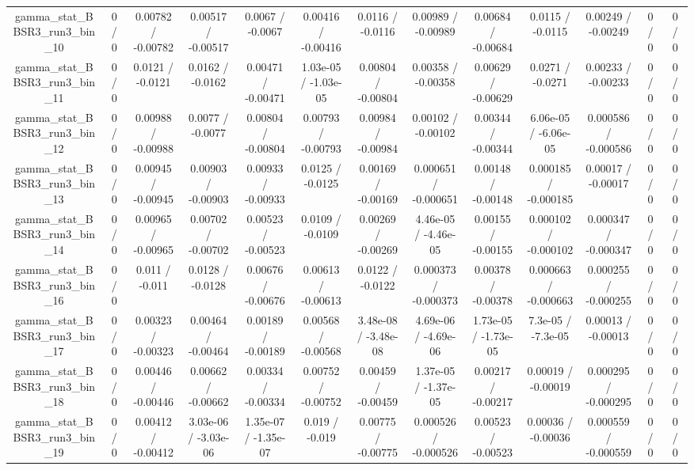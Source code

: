 \documentclass[10pt]{article}
\begin{document}
\begin{table}[htbp]
\begin{center}
\begin{tabular}{|c|c|c|c|c|c|c|c|c|c|c|c|c|}
  gamma_stat_BBSR3_run3_bin_10 & 0 / 0 & 0.00782 / -0.00782 & 0.00517 / -0.00517 & 0.0067 / -0.0067 & 0.00416 / -0.00416 & 0.0116 / -0.0116 & 0.00989 / -0.00989 & 0.00684 / -0.00684 & 0.0115 / -0.0115 & 0.00249 / -0.00249 & 0 / 0 & 0 / 0 \\ 
  gamma_stat_BBSR3_run3_bin_11 & 0 / 0 & 0.0121 / -0.0121 & 0.0162 / -0.0162 & 0.00471 / -0.00471 & 1.03e-05 / -1.03e-05 & 0.00804 / -0.00804 & 0.00358 / -0.00358 & 0.00629 / -0.00629 & 0.0271 / -0.0271 & 0.00233 / -0.00233 & 0 / 0 & 0 / 0 \\ 
  gamma_stat_BBSR3_run3_bin_12 & 0 / 0 & 0.00988 / -0.00988 & 0.0077 / -0.0077 & 0.00804 / -0.00804 & 0.00793 / -0.00793 & 0.00984 / -0.00984 & 0.00102 / -0.00102 & 0.00344 / -0.00344 & 6.06e-05 / -6.06e-05 & 0.000586 / -0.000586 & 0 / 0 & 0 / 0 \\ 
  gamma_stat_BBSR3_run3_bin_13 & 0 / 0 & 0.00945 / -0.00945 & 0.00903 / -0.00903 & 0.00933 / -0.00933 & 0.0125 / -0.0125 & 0.00169 / -0.00169 & 0.000651 / -0.000651 & 0.00148 / -0.00148 & 0.000185 / -0.000185 & 0.00017 / -0.00017 & 0 / 0 & 0 / 0 \\ 
  gamma_stat_BBSR3_run3_bin_14 & 0 / 0 & 0.00965 / -0.00965 & 0.00702 / -0.00702 & 0.00523 / -0.00523 & 0.0109 / -0.0109 & 0.00269 / -0.00269 & 4.46e-05 / -4.46e-05 & 0.00155 / -0.00155 & 0.000102 / -0.000102 & 0.000347 / -0.000347 & 0 / 0 & 0 / 0 \\ 
  gamma_stat_BBSR3_run3_bin_16 & 0 / 0 & 0.011 / -0.011 & 0.0128 / -0.0128 & 0.00676 / -0.00676 & 0.00613 / -0.00613 & 0.0122 / -0.0122 & 0.000373 / -0.000373 & 0.00378 / -0.00378 & 0.000663 / -0.000663 & 0.000255 / -0.000255 & 0 / 0 & 0 / 0 \\ 
  gamma_stat_BBSR3_run3_bin_17 & 0 / 0 & 0.00323 / -0.00323 & 0.00464 / -0.00464 & 0.00189 / -0.00189 & 0.00568 / -0.00568 & 3.48e-08 / -3.48e-08 & 4.69e-06 / -4.69e-06 & 1.73e-05 / -1.73e-05 & 7.3e-05 / -7.3e-05 & 0.00013 / -0.00013 & 0 / 0 & 0 / 0 \\ 
  gamma_stat_BBSR3_run3_bin_18 & 0 / 0 & 0.00446 / -0.00446 & 0.00662 / -0.00662 & 0.00334 / -0.00334 & 0.00752 / -0.00752 & 0.00459 / -0.00459 & 1.37e-05 / -1.37e-05 & 0.00217 / -0.00217 & 0.00019 / -0.00019 & 0.000295 / -0.000295 & 0 / 0 & 0 / 0 \\ 
  gamma_stat_BBSR3_run3_bin_19 & 0 / 0 & 0.00412 / -0.00412 & 3.03e-06 / -3.03e-06 & 1.35e-07 / -1.35e-07 & 0.019 / -0.019 & 0.00775 / -0.00775 & 0.000526 / -0.000526 & 0.00523 / -0.00523 & 0.00036 / -0.00036 & 0.000559 / -0.000559 & 0 / 0 & 0 / 0 \\ 

\end{tabular}
\end{center}
\end{table}
\end{document}
